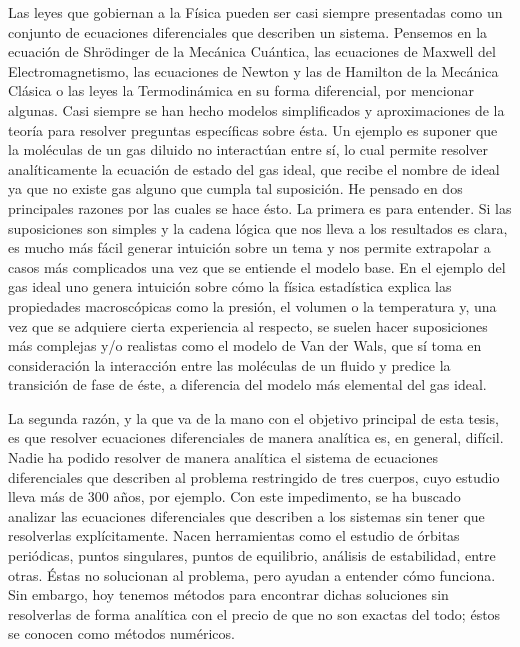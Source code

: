 Las leyes que gobiernan a la Física pueden ser casi siempre presentadas como un conjunto de ecuaciones diferenciales que describen un sistema. Pensemos en la ecuación de Shrödinger de la Mecánica Cuántica, las ecuaciones de Maxwell del Electromagnetismo, las ecuaciones de Newton y las de Hamilton de la Mecánica Clásica o las leyes la Termodinámica en su forma diferencial, por mencionar algunas. Casi siempre se han hecho modelos simplificados y aproximaciones de la teoría para resolver preguntas específicas sobre ésta. Un ejemplo es suponer que la moléculas de un gas diluido no interactúan entre sí, lo cual permite resolver analíticamente la ecuación de estado del gas ideal, que recibe el nombre de ideal ya que no existe gas alguno que cumpla tal suposición. He pensado en dos principales razones por las cuales se hace ésto. La primera es para entender. Si las suposiciones son simples y la cadena lógica que nos lleva a los resultados es clara, es mucho más fácil generar intuición sobre un tema y nos permite extrapolar a casos más complicados una vez que se entiende el modelo base. En el ejemplo del gas ideal uno genera intuición sobre cómo la física estadística explica las propiedades macroscópicas como la presión, el volumen o la temperatura y, una vez que se adquiere cierta experiencia al respecto, se suelen hacer suposiciones más complejas y/o realistas como el modelo de Van der Wals, que sí toma en consideración la interacción entre las moléculas de un fluido y predice la transición de fase de éste, a diferencia del modelo más elemental del gas ideal. 

La segunda razón, y la que va de la mano con el objetivo principal de esta tesis, es que resolver ecuaciones diferenciales de manera analítica es, en general, difícil. Nadie ha podido resolver de manera analítica el sistema de ecuaciones diferenciales que describen al problema restringido de tres cuerpos, cuyo estudio lleva más de 300 años, por ejemplo. Con este impedimento, se ha buscado analizar las ecuaciones diferenciales que describen a los sistemas sin tener que resolverlas explícitamente. Nacen herramientas como el estudio de órbitas periódicas, puntos singulares, puntos de equilibrio, análisis de estabilidad, entre otras. Éstas no solucionan al problema, pero ayudan a entender cómo funciona. Sin embargo, hoy tenemos métodos para encontrar dichas soluciones sin resolverlas de forma analítica con el precio de que no son exactas del todo; éstos se conocen como métodos numéricos. 

